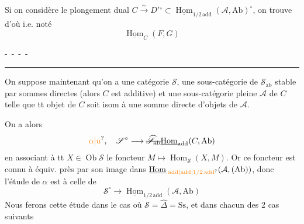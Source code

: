 Si on considère le plongement
dual $C\xrightarrow{\sim}D'{}^\circ\subset\underline{\operatorname{Hom}}_{1/2\,\mathrm{add}}(\mathcal A,\mathrm{Ab})^\circ$,
on trouve
d'où
i.e.
noté
\[
 \underline{\operatorname{Hom}}_C(F,G)
\]

-\, -\, -\, -

\noindent\hfil\rule{0.4\linewidth}{0.35pt}\hfil

On suppose maintenant qu'on a
une catégorie $\mathscr S$, une sous-catégorie
 de $\mathscr S_{\mathrm{ab}}$ stable par sommes directes
(alors $C$ est additive) et une
sous-catégorie pleine $\mathcal A$ de $C$ telle
que tt objet de $C$ soit isom à une
somme directe   d'objets de $\mathcal A$.

On a alors 
\[
 \unsure{\alpha|u},\quad \mathscr S^\circ\longrightarrow
 \deleted{\widehat{\mathscr S}_{\mathrm{ab}}}
 \underline{\operatorname{Hom}}_{\mathrm{add}}(C,\mathrm{Ab})
\]
 en associant à tt $X\in\operatorname{Ob}\mathscr S$
le foncteur $M\longmapsto\operatorname{Hom}_{\mathscr S}(X,M)$.
Or ce foncteur est connu à équiv.
près par   son image
dans $\underline{\operatorname{Hom}}_{\unsure{.\mathrm{add}|\mathrm{add}|1/2\,\mathrm{add}}}(\mathcal A,(\mathrm{Ab}))$, donc l'étude
de $\alpha$ est  à celle de
\[
 \mathscr S^\circ\longrightarrow\underline{\operatorname{Hom}}_{1/2\,\mathrm{add}}(\mathcal A,\mathrm{Ab})
\]
Nous ferons cette étude dans le
cas où $\mathscr S=\widehat\Delta=\mathrm{Ss}$, et dans
chacun des 2 cas suivants

